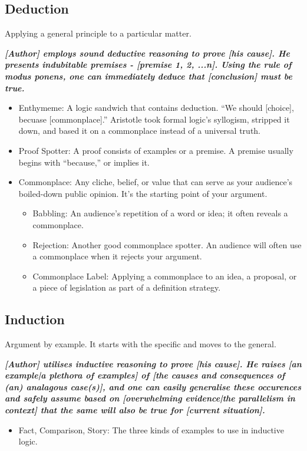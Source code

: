 \subsection{Deduction}
Applying a general principle to a particular matter.

\emph{\textbf{[Author] employs sound deductive reasoning to prove [his cause]. He presents indubitable premises - [premise 1, 2, ...n]. Using the rule of modus ponens, one can immediately deduce that [conclusion] must be true.}}

\begin{itemize}
	\item Enthymeme: A logic sandwich that contains deduction. ``We should [choice], becuase [commonplace].'' Aristotle took formal logic's syllogism, stripped it down, and based it on a commonplace instead of a universal truth.
	\item Proof Spotter: A proof consists of examples or a premise. A premise usually begins with ``because,'' or implies it.
	\item Commonplace: Any cliche, belief, or value that can serve as your audience's boiled-down public opinion. It's the starting point of your argument.
		\begin{itemize}
			\item Babbling: An audience's repetition of a word or idea; it often reveals a commonplace.
			\item Rejection: Another good commonplace spotter. An audience will often use a commonplace when it rejects your argument.
			\item Commonplace Label: Applying a commonplace to an idea, a proposal, or a piece of legislation as part of a definition strategy.
		\end{itemize}
\end{itemize}

\subsection{Induction}
Argument by example. It starts with the specific and moves to the general. 

\emph{\textbf{[Author] utilises inductive reasoning to prove [his cause]. He raises [an example|a plethora of examples] of [the causes and consequences of (an) analagous case(s)], and one can easily generalise these occurences and safely assume based on [overwhelming evidence|the parallelism in context] that the same will also be true for [current situation].  
}}\begin{itemize}
	\item Fact, Comparison, Story: The three kinds of examples to use in inductive logic.
\end{itemize}

